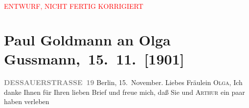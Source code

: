 
\begin{center}
            \textcolor{red}{ENTWURF, NICHT FERTIG KORRIGIERT}
                      \end{center}
            
         
         \renewcommand{\erwaehntePersonen}{Personen: Paul Goldmann, Gerhart Hauptmann, Olga Schnitzler, Elisabeth Steinrück}
         \renewcommand{\erwaehnteOrte}{Orte: Berlin, Dessauer Straße, Hotel Edlacherhof, Wien}
         \renewcommand{\erwaehnteWerke}{Werke: Berliner Brief. [»Schluck und Jau« von Gerhart Hauptmann am Deutschen Theater], Berliner Theater. »Einsame Menschen« im Deutschen Theater, Einsame Menschen. Drama, Neue Freie Presse, »Michael Kramer.«}
               \section[ Paul Goldmann an Olga Gussmann, 15. 11. {[}1901{]}]{ Paul Goldmann an Olga Gussmann, 15. 11. {[}1901{]}}\nopagebreak{}\rehead{ }\begin{ledgroupsized}[t]{13cm}\normalsize\beginnumbering \toendnotes[C]{\smallbreak\pagebreak[2]} 
\toendnotes[C]{\smallbreak}\pstart
           \noindent{}\raggedleft{}{\pb}\textcolor{gray}{\textbf{DESSAUERSTRASSE 19}}\pend
           \pstart
           Berlin, 15. November.\pend
           \pstart{}Liebes Fräulein \textsc{Olga},\pend\pstart
           Ich danke Ihnen für Ihren lieben Brief und freue mich, daß Sie und \textsc{Arthur} ein paar \label{K_L03535-1v}\label{K_L03535-1h} haben verleben

\end{ledgroupsized}
